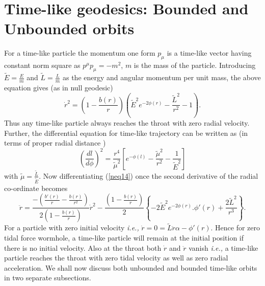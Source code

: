 \documentclass[10pt]{revtex4}
\begin{document}
\section{Time-like geodesics: Bounded and Unbounded orbits}
\label{sec:vi}
For a time-like particle the momentum one form $p_\mu$ is a time-like vector having constant norm square as $p^\mu p_\mu=-m^2$, $m$ is the mass of the particle. Introducing $\tilde{E}=\frac{E}{m}$ and $\tilde{L}=\frac{L}{m}$ as the energy and angular momentum per unit mass, the above equation gives (as in null geodesic)
\begin{equation}\label{neq14}
\dot{r}^2=\left(1-\frac{b(r)}{r}\right)\left({\tilde{E}}^2e^{-2\phi(r)}-\frac{\tilde{L}^2}{r^2}-1\right).
\end{equation}
Thus any time-like particle always reaches the throat with zero radial velocity. Further, the differential equation for time-like trajectory can be written as (in terms of proper radial distance )
\begin{equation}
\left(\frac{dl}{d\phi}\right)^2=\frac{r^4}{\tilde{\mu}^2}\left[e^{-\phi(l)}-\frac{\tilde{\mu}^2}{r^2}-\frac{1}{\tilde{E}^2}\right]
\end{equation}
with $\tilde{\mu}=\frac{\tilde{L}}{\tilde{E}}$. Now differentiating (\ref{neq14}) once the second derivative of the radial co-ordinate becomes
\begin{equation}
\ddot{r}=\frac{-\left(\frac{b'(r)}{r}-\frac{b(r)}{r^2}\right)}{2(1-\frac{b(r)}{r})}\dot{r}^2-\frac{\left(1-\frac{b(r)}{r}\right)}{2}\left\{-2\tilde{E}^2e^{-2\phi(r)}.\phi'(r)+\frac{2\tilde{L}^2}{r^3}\right\}.
\end{equation} 
For a particle with zero initial velocity {\it i.e.,} $\dot{r}=0=\tilde{L}\ddot{r}\alpha-\phi'(r).$ Hence for zero tidal force wormhole, a time-like particle will remain at the initial position if there is no initial velocity. Also at the throat both $\dot{r}$ and $\ddot{r}$ vanish {\it i.e.,} a time-like particle reaches the throat with zero tidal velocity as well as zero radial acceleration. We shall now discuss both unbounded and bounded time-like orbits in two separate subsections.
\end{document}
